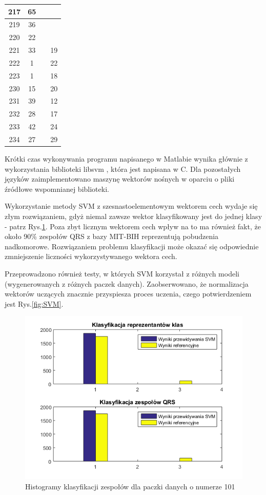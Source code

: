 \begin{table}[!tp]
\begin{tabular}{|c|c|c|c|}
		217 & 65 &  & \\ \hline
		219 & 36 &  & \\ \hline
		220 & 22 &  & \\ \hline	
		221 & 33 &  & 19\\ \hline
		222 &  1 &  & 22\\ \hline
		223 &  1 &  & 18\\ \hline
		230 & 15 &  & 20\\ \hline
		231 & 39 &  & 12\\ \hline
		232 & 28 &  & 17\\ \hline
		233 & 42 &  & 24\\ \hline
		234 & 27 &  & 29\\ \hline
	\end{tabular}
\end{table}

Krótki czas wykonywania programu napisanego w Matlabie wynika głównie z wykorzystania biblioteki libsvm \cite{csie}, która jest napisana w C. Dla pozostałych języków zaimplementowano maszynę wektorów nośnych w oparciu o pliki źródłowe wspomnianej biblioteki.

Wykorzystanie metody SVM z szesnastoelementowym wektorem cech wydaje się złym rozwiązaniem, gdyż niemal zawsze wektor klasyfikowany jest do jednej klasy - patrz Rys.\ref{fig:hist1}. Poza zbyt licznym wektorem cech wpływ na to ma również fakt, że około 90\% zespołów QRS z bazy MIT-BIH reprezentują pobudzenia nadkomorowe. Rozwiązaniem problemu klasyfikacji może okazać się odpowiednie zmniejszenie liczności wykorzystywanego wektora cech.

Przeprowadzono również testy, w których SVM korzystał z różnych modeli (wygenerowanych z różnych paczek danych). Zaobserwowano, że normalizacja wektorów uczących znacznie przyspiesza proces uczenia, czego potwierdzeniem jest Rys.\ref{fig:SVM}.

\begin{figure}[!htp]
	\centering
	\includegraphics[width=15cm]{Grafika/101_2_3}
	\caption{Histogramy klasyfikacji zespołów dla paczki danych o numerze 101}
	\label{fig:hist1}
\end{figure}

